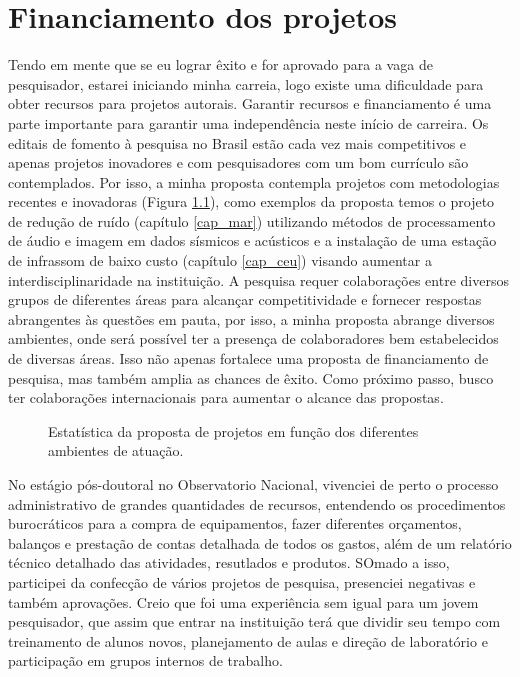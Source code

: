 \documentclass[10pt,a4paper,oneside]{book}
\begin{document}

\chapter{Financiamento dos projetos}
\label{cap_financiamento}

Tendo em mente que se eu lograr êxito e for aprovado para a vaga de pesquisador, estarei iniciando minha carreia, logo existe uma dificuldade para obter recursos para projetos autorais. Garantir recursos e financiamento é uma parte importante para garantir uma independência neste início de carreira. Os editais de fomento à pesquisa no Brasil estão cada vez mais competitivos e apenas projetos inovadores e com pesquisadores com um bom currículo são contemplados. Por isso, a minha proposta contempla projetos com metodologias recentes e inovadoras (Figura \ref{fig_resumo_projetos}), como exemplos da proposta temos o projeto de redução de ruído (capítulo \ref{cap_mar}) utilizando métodos de processamento de áudio e imagem em dados sísmicos e acústicos e a instalação de uma estação de infrassom de baixo custo (capítulo \ref{cap_ceu}) visando aumentar a interdisciplinaridade na instituição. A pesquisa requer colaborações entre diversos grupos de diferentes áreas para alcançar competitividade e fornecer respostas abrangentes às questões em pauta, por isso, a minha proposta abrange diversos ambientes, onde será possível ter a presença de colaboradores bem estabelecidos de diversas áreas. Isso não apenas fortalece uma proposta de financiamento de pesquisa, mas também amplia as chances de êxito. Como próximo passo, busco ter colaborações internacionais para aumentar o alcance das propostas.

\begin{figure}[ht]
	\centering
	\caption{Estatística da proposta de projetos em função dos diferentes ambientes de atuação.}
	\label{fig_resumo_projetos}
\end{figure}

No estágio pós-doutoral no Observatorio Nacional, vivenciei de perto o processo administrativo de grandes quantidades de recursos, entendendo os procedimentos burocráticos para a compra de equipamentos, fazer diferentes orçamentos, balanços e prestação de contas detalhada de todos os gastos, além de um relatório técnico detalhado das atividades, resutlados e produtos. SOmado a isso, participei da confecção de vários projetos de pesquisa, presenciei negativas e também aprovações. Creio que foi uma experiência sem igual para um jovem pesquisador, que assim que entrar na instituição terá que dividir seu tempo com treinamento de alunos novos, planejamento de aulas e direção de laboratório e participação em grupos internos de trabalho.
\end{document}
